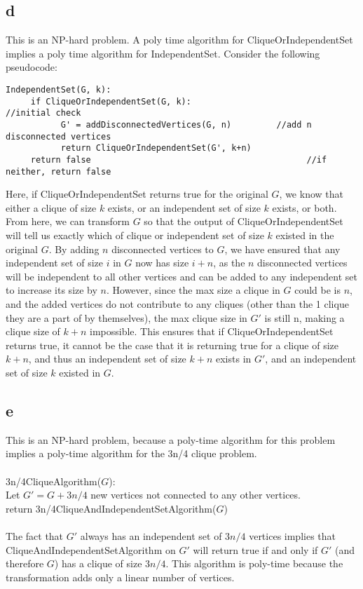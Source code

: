\documentclass[letterpaper,notitlepage,twoside]{article}
\newcommand\tab[1][1cm]{\hspace*{#1}} %
\begin{document}
\subsection*{d}
This is an NP-hard problem. A poly time algorithm for CliqueOrIndependentSet implies a poly time algorithm for IndependentSet. Consider the following pseudocode:
\begin{verbatim}
IndependentSet(G, k):
     if CliqueOrIndependentSet(G, k):                            //initial check
           G' = addDisconnectedVertices(G, n)         //add n disconnected vertices
           return CliqueOrIndependentSet(G', k+n)
     return false                                           //if neither, return false
\end{verbatim}
Here, if CliqueOrIndependentSet returns true for the original $G$, we know that either a clique of size $k$ exists, or an independent set of size $k$ exists, or both. From here, we can transform $G$ so that the output of CliqueOrIndependentSet will tell us exactly which of clique or independent set of size $k$ existed in the original $G$. By adding $n$ disconnected vertices to $G$, we have ensured that any independent set of size $i$ in $G$ now has size $i + n$, as the $n$ disconnected vertices will be independent to all other vertices and can be added to any independent set to increase its size by $n$. However, since the max size a clique in $G$ could be is $n$, and the added vertices do not contribute to any cliques (other than the 1 clique they are a part of by themselves), the max clique size in $G'$ is still n, making a clique size of $k+n$ impossible. This ensures that if CliqueOrIndependentSet returns true, it cannot be the case that it is returning true for a clique of size $k+n$, and thus an independent set of size $k+n$ exists in $G'$, and an independent set of size $k$ existed in $G$. 

\subsection*{e}
This is an NP-hard problem, because a poly-time algorithm for this problem implies a poly-time algorithm for the 3n/4 clique problem.
\\\\
3n/4CliqueAlgorithm($G$):\\
\tab Let $G' = G + 3n/4$ new vertices not connected to any other vertices.\\
\tab return 3n/4CliqueAndIndependentSetAlgorithm($G$)
\\\\
The fact that $G'$ always has an independent set of $3n/4$ vertices implies that CliqueAndIndependentSetAlgorithm on $G'$ will return true if and only if $G'$ (and therefore $G$) has a clique of size $3n/4$. This algorithm is poly-time because the transformation adds only a linear number of vertices.
\end{document}
